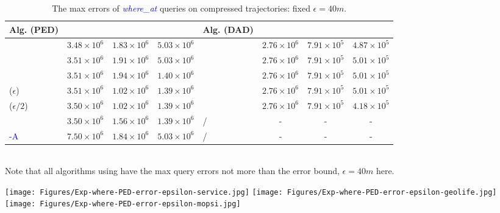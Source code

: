 {\begin{table}
	\caption{\small The max errors of \textcolor{blue}{\emph{where\_at}} queries on compressed trajectories: fixed $\epsilon=40m$.}
	\centering
	\scriptsize
	\vspace{-1ex}
	\begin{tabular}{|l|c|c|c|l|c|c|c|}
		\hline
		\bf{Alg. (PED)}  &\ucar &\geolife &\mopsi & \bf{Alg. (DAD)}  &\ucar &\geolife &\mopsi \\
		\hline
		{\dpa} &	$3.48 \times 10^6$ & $1.83 \times 10^6$ &	$5.03 \times 10^6$	& \dpa	& $2.76 \times 10^6$	& $7.91 \times 10^5$	& $4.87 \times 10^5$ \\
		\hline
		{\tpa} &	$3.51 \times 10^6$ & $1.91 \times 10^6$ &	$5.03 \times 10^6$	& \tpa	& $2.76 \times 10^6$	& $7.91 \times 10^5$	& $5.01 \times 10^5$ \\
		\hline
		{\bqsa} &	$3.51 \times 10^6$ & $1.94 \times 10^6$ &	$1.40 \times 10^6$	& \opwa	& $2.76 \times 10^6$	& $7.91 \times 10^5$	& $5.01 \times 10^5$ \\
		\hline
		{\siped($\epsilon$)} &	$3.51 \times 10^6$ & $1.02 \times 10^6$ &	$1.39 \times 10^6$	& \interval	& $2.76 \times 10^6$	& $7.91 \times 10^5$	& $5.01 \times 10^5$ \\
		\hline
		{\siped($\epsilon/2$)} &	$3.50 \times 10^6$ & $1.02 \times 10^6$ &	$1.39 \times 10^6$	& \intersec	& $2.76 \times 10^6$	& $7.91 \times 10^5$	& $4.18 \times 10^5$ \\
		\hline
		{\operb} &	$3.50 \times 10^6$ & $1.56 \times 10^6$ &	$1.39 \times 10^6$	& / & -  & - & -  \\
		\hline
		\textcolor{blue}{\operb-A} &	${7.50\times 10^6} $ & ${1.84\times 10^6} $ & ${5.03\times 10^6} $ & / &- &- &- \\
		\hline
	\end{tabular}
	\label{tab:query-me}
	\vspace{0.5ex}
	\\{Note that all algorithms using \sed have the max query errors not more than the error bound, \ie $\epsilon=40m$ here.}
	\vspace{-1ex}
\end{table}


\begin{figure*}[tb!]
	\centering
	\texttt{[image: Figures/Exp-where-PED-error-epsilon-service.jpg]}\hspace{0.5ex}
	\texttt{[image: Figures/Exp-where-PED-error-epsilon-geolife.jpg]}\hspace{0.5ex}
	\texttt{[image: Figures/Exp-where-PED-error-epsilon-mopsi.jpg]}
	\vspace{-2ex}
	\caption{\small Evaluation of \textcolor{blue}{\emph{where\_at}} queries (PED) on full datasets: varying error bound $\epsilon$.}
	\label{fig:query-ped-epsilon}
	\vspace{-1.0ex}
\end{figure*}

}
